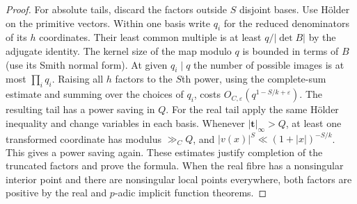 \documentclass[11pt,letterpaper]{article}
\theoremstyle{definition}
\newcommand{\eps}{\varepsilon}
\begin{document}
\begin{proof}
For absolute tails, discard the factors outside $S$ disjoint bases.
Use H\"older on the primitive vectors. Within one basis write $q_i$
for the reduced denominators of its $h$ coordinates. Their least common
multiple is at least $q/|\det B|$ by the adjugate identity. The
kernel size of the map modulo $q$ is bounded in terms of $B$ (use its
Smith normal form). At given $q_i\mid q$ the number of possible images
is at most $\prod_i q_i$. Raising all $h$ factors to the $S$th power,
using the complete-sum estimate and summing over the choices of $q_i$,
costs $O_{C,\eps}(q^{1-S/k+\eps})$. The resulting tail has a power
saving in $Q$. For the real tail apply the same H\"older inequality
and change variables in each basis. Whenever $|\mathbf t|_\infty>Q$,
at least one transformed coordinate has modulus $\gg_C Q$, and
$|v(x)|^S\ll(1+|x|)^{-S/k}$. This gives a power saving again.
These estimates justify completion of the truncated factors and
prove the formula. When the real fibre has a nonsingular interior
point and there are nonsingular local points everywhere, both factors
are positive by the real and $p$-adic implicit function theorems.
\end{proof}
\end{document}
